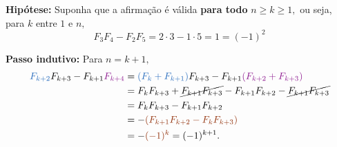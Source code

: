 \documentclass[12pt, a4paper]{article}
\begin{document}
\begin{solution}
{ \textbf{Hipótese:} Suponha que a afirmação é válida \textbf{para todo} $n \geq k \geq 1,$ ou seja, para $k$ entre $1$ e $n,$
$$F_{3}F_{4}-F_{2}F_{5}=2\cdot3-1\cdot5=1= \left( -1 \right) ^{2}$$
 
 \textbf{Passo indutivo:} Para $n = k+1,$
\begin{align*}
\textcolor{NavyBlue}{F_{k+2}}F_{k+3}-F_{k+1}\textcolor{Plum}{F_{k+4}}&=\textcolor{NavyBlue}{\left( F_{k}+F_{k+1} \right)} F_{k+3}-F_{k+1} \textcolor{Plum}{\left( F_{k+2}+F_{k+3} \right)}\\ 
&=F_{k}F_{k+3}+\cancel{F_{k+1}F_{k+3}}-F_{k+1} F_{k+2}-\cancel{F_{k+1}F_{k+3}}\\
&=F_{k}F_{k+3}-F_{k+1} F_{k+2}\\
&=-\textcolor{RawSienna}{(F_{k+1} F_{k+2}-F_{k}F_{k+3})}\\
&=-\textcolor{RawSienna}{(-1)^{k}}=(-1)^{k+1}.
\end{align*}
}

\end{solution}
\end{document}
